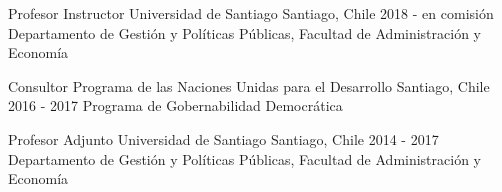 





\begin{cventries}
\cventry
{Profesor Instructor} 
{Universidad de Santiago} 
{Santiago, Chile} 
{2018 - en comisión}
{Departamento de Gestión y Políticas Públicas, Facultad de Administración y Economía}\vspace{1.5mm}

\cventry
{Consultor} 
{Programa de las Naciones Unidas para el Desarrollo} 
{Santiago, Chile} 
{2016 - 2017}
{Programa de Gobernabilidad Democrática} \vspace{1.5mm}

\cventry
{Profesor Adjunto} 
{Universidad de Santiago} 
{Santiago, Chile} 
{2014 - 2017}
{Departamento de Gestión y Políticas Públicas, Facultad de Administración y Economía}\vspace{1.5mm}

\end{cventries}
